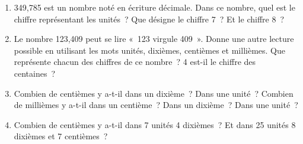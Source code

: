 \begin{activite}
\begin{enumerate}
 \item 349,785 est un nombre noté en écriture décimale. Dans ce nombre, quel est le chiffre représentant les unités ? Que désigne le chiffre 7 ? Et le chiffre 8 ?
 \item Le nombre 123,409 peut se lire « 123 virgule 409 ». Donne une autre lecture possible en utilisant les mots unités, dixièmes, centièmes et millièmes.
Que représente chacun des chiffres de ce nombre ? 4 est-il le chiffre des centaines ?
 \item Combien de centièmes y a-t-il dans un  dixième ? Dans une  unité ?
Combien de millièmes y a-t-il dans un centième ? Dans un dixième ? Dans une unité ?
 \item Combien de centièmes y a-t-il dans 7 unités 4 dixièmes ? Et dans 25 unités 8 dixièmes et 7 centièmes ?
 \end{enumerate}
\end{activite}





